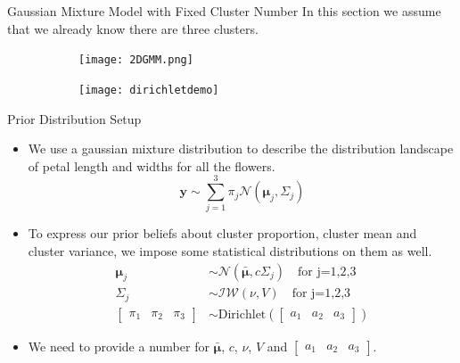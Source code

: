 \documentclass{beamer}
\begin{document}
	\begin{frame}{Gaussian Mixture Model with Fixed Cluster Number}
		In this section we assume that we already know there are three clusters.
		\begin{figure}[htbp]
		\begin{subfigure}[b]{0.48\columnwidth}
			\centering
			\texttt{[image: 2DGMM.png]}
		\end{subfigure}
		\hfill
		\begin{subfigure}[b]{0.48\columnwidth}
			\centering
			\texttt{[image: dirichletdemo]}
		\end{subfigure}
			\end{figure}
	\end{frame}

	\begin{frame}{Prior Distribution Setup}
		\begin{itemize}
			\item We use a gaussian mixture distribution to describe the distribution landscape of petal length and widths for all the flowers.
			$$ \bm{y} \sim \sum_{j=1}^{3}\pi_j \mathcal{N}(\bm{\mu}_j, \Sigma_{j}) $$
			\item To express our prior beliefs about cluster proportion, cluster mean and cluster variance, we impose some statistical distributions on them as well.
			\begin{align*}
				\bm{\mu}_j & \sim \mathcal{N}(\bar{\bm{\mu}}, c\Sigma_j)\quad \text{for j=1,2,3}\\
				\Sigma_j & \sim \mathcal{IW}(\nu, V) \quad \text{for j=1,2,3} \\
				\begin{bmatrix} \pi_1 & \pi_2 & \pi_3 \end{bmatrix} & \sim \text{Dirichlet}(\begin{bmatrix} a_1 & a_2 & a_3 \end{bmatrix})
			\end{align*}
			\item We need to provide a number for $\bar{\bm{\mu}}$, $c$, $\nu$, $V$ and $\begin{bmatrix} a_1 & a_2 & a_3 \end{bmatrix}$.
		\end{itemize}
	\end{frame}
\end{document}
